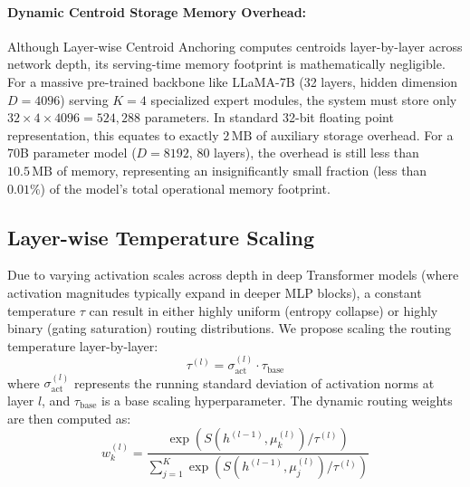 \documentclass{article}
\theoremstyle{plain}
\theoremstyle{definition}
\theoremstyle{remark}
\begin{document}
\paragraph{Dynamic Centroid Storage Memory Overhead:} Although Layer-wise Centroid Anchoring computes centroids layer-by-layer across network depth, its serving-time memory footprint is mathematically negligible. For a massive pre-trained backbone like LLaMA-7B (32 layers, hidden dimension $D = 4096$) serving $K = 4$ specialized expert modules, the system must store only $32 \times 4 \times 4096 = 524,288$ parameters. In standard 32-bit floating point representation, this equates to exactly $2\,\text{MB}$ of auxiliary storage overhead. For a 70B parameter model ($D = 8192$, 80 layers), the overhead is still less than $10.5\,\text{MB}$ of memory, representing an insignificantly small fraction (less than $0.01\%$) of the model's total operational memory footprint.

\subsection{Layer-wise Temperature Scaling}
Due to varying activation scales across depth in deep Transformer models (where activation magnitudes typically expand in deeper MLP blocks), a constant temperature $\tau$ can result in either highly uniform (entropy collapse) or highly binary (gating saturation) routing distributions. We propose scaling the routing temperature layer-by-layer:
\begin{equation}
    \tau^{(l)} = \sigma_{\text{act}}^{(l)} \cdot \tau_{\text{base}}
\end{equation}
where $\sigma_{\text{act}}^{(l)}$ represents the running standard deviation of activation norms at layer $l$, and $\tau_{\text{base}}$ is a base scaling hyperparameter. The dynamic routing weights are then computed as:
\begin{equation}
    w_k^{(l)} = \frac{\exp\left(S\left(h^{(l-1)}, \mu_k^{(l)}\right) / \tau^{(l)}\right)}{\sum_{j=1}^K \exp\left(S\left(h^{(l-1)}, \mu_j^{(l)}\right) / \tau^{(l)}\right)}
\end{equation}
\end{document}

